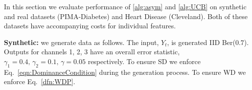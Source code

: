 

In this section we evaluate performance of \ref{alg:asym} and \ref{alg:UCB} on synthetic and real datasets (PIMA-Diabetes) and Heart Disease (Cleveland). Both of these datasets have accompanying costs for individual features.%

{\bf Synthetic:} we generate data as follows. The input, $Y_t$, is generated IID Ber($0.7$). Outputs for channels 1, 2, 3 have an overall error statistic, $\gamma_1 = 0.4,\,\gamma_2=0.1,\,\gamma=0.05$ respectively. To ensure SD we enforce Eq.~\ref{eqn:DominanceCondition} during the generation process. To ensure WD we enforce Eq.~\ref{dfn:WDP}.  %

